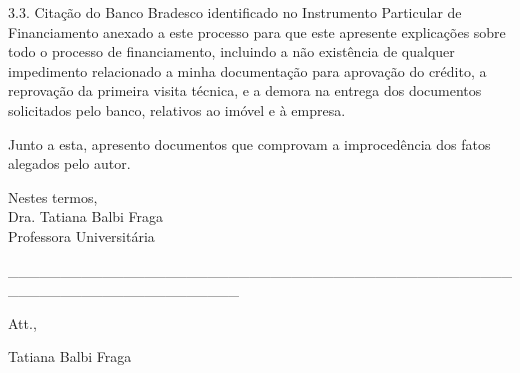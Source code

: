 \documentclass[11pt]{letter}
\begin{document}
3.3. Citação do Banco Bradesco identificado no Instrumento Particular de Financiamento anexado a este processo para que este apresente explicações sobre todo o processo de financiamento, incluindo a não existência de qualquer impedimento relacionado a minha documentação para aprovação do crédito, a reprovação da primeira visita técnica, e a demora na entrega dos documentos solicitados pelo banco, relativos ao imóvel e à empresa. 

	
Junto a esta, apresento documentos que comprovam a improcedência dos fatos alegados pelo autor.

Nestes termos, \\
Dra. Tatiana Balbi Fraga \\
Professora Universitária

\begin{center}
             \_\_\_\_\_\_\_\_\_\_\_\_\_\_\_\_\_\_\_\_\_\_\_\_\_\_\_\_\_\_\_\_\_\_\_\_\_\_\_\_\_\_\_\_\_\_\_\_\_\_\_\_\_\_\_\_\_\_\_\_\_\_\_\_\_\_\_\_\_\_
    
\end{center}  
          
Att.,

Tatiana Balbi Fraga
\end{document}
